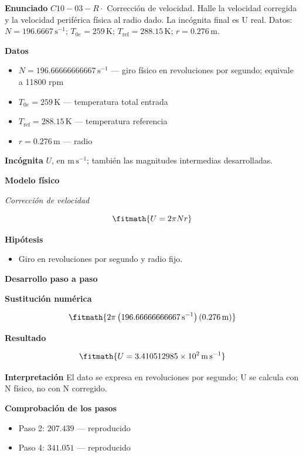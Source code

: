 \documentclass[10pt,openany]{book}
\begin{document}
\begin{tcolorbox}[title={Problema resuelto 3}, studiumworked, breakable]

\noindent\textbf{Enunciado}
\(C10-03-R \cdot\) Corrección de velocidad. Halle la velocidad corregida y la velocidad periférica física al radio dado. La incógnita final es U real. Datos: \(N=196.6667\, \mathrm{s}^{-1}\); \(T_{0e}=259\, \mathrm{K}\); \(T_{\mathrm{ref}}=288.15\, \mathrm{K}\); \(r=0.276\, \mathrm{m}\).

\noindent\textbf{Datos}
\begin{itemize}
\item $N = 196.66666666667\,\mathrm{s}^{-1}$ — giro físico en revoluciones por segundo; equivale a 11800 rpm
\item $T_{0e} = 259\,\mathrm{K}$ — temperatura total entrada
\item $T_{\mathrm{ref}} = 288.15\,\mathrm{K}$ — temperatura referencia
\item $r = 0.276\,\mathrm{m}$ — radio
\end{itemize}

\noindent\textbf{Incógnita}
$U$, en $\mathrm{m\,s^{-1}}$; también las magnitudes intermedias desarrolladas.

\noindent\textbf{Modelo físico}

\noindent\textit{Corrección de velocidad}

\[
\fitmath{U=2 \pi N r}
\]

\noindent\textbf{Hipótesis}
\begin{itemize}
\item Giro en revoluciones por segundo y radio fijo.
\end{itemize}

\noindent\textbf{Desarrollo paso a paso}



\noindent\textbf{Sustitución numérica}

\[
\fitmath{2 \pi \left(196.66666666667\,\mathrm{s}^{-1}\right) \left(0.276\,\mathrm{m}\right)}
\]

\noindent\textbf{Resultado}

\[
\fitmath{U=3.410512985\times10^{2}\,\mathrm{m}\,\mathrm{s}^{-1}}
\]

\noindent\textbf{Interpretación}
El dato se expresa en revoluciones por segundo; U se calcula con N físico, no con N corregido.

\noindent\textbf{Comprobación de los pasos}
\begin{itemize}
\item Paso 2: $207.439$ — reproducido
\item Paso 4: $341.051$ — reproducido
\end{itemize}


\end{tcolorbox}
\end{document}
